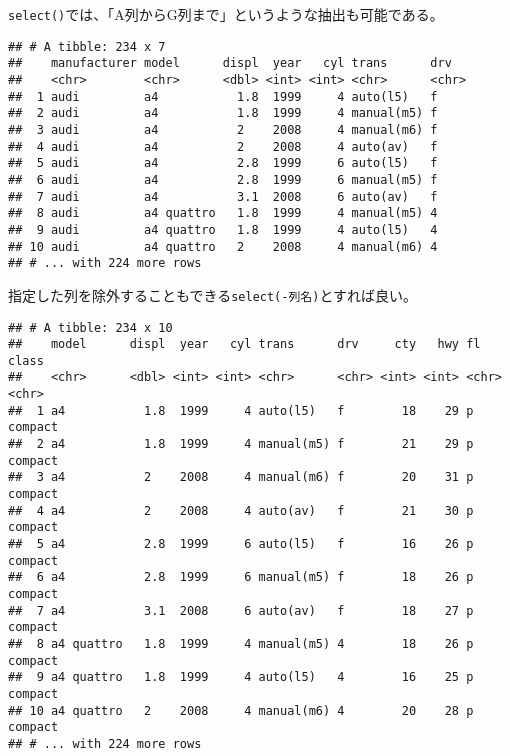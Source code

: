 \documentclass[]{book}
\newenvironment{Shaded}{\begin{snugshade}}{\end{snugshade}}
\newcommand{\KeywordTok}[1]{\textcolor[rgb]{0.13,0.29,0.53}{\textbf{#1}}}
\newcommand{\StringTok}[1]{\textcolor[rgb]{0.31,0.60,0.02}{#1}}
\newcommand{\CommentTok}[1]{\textcolor[rgb]{0.56,0.35,0.01}{\textit{#1}}}
\newcommand{\OperatorTok}[1]{\textcolor[rgb]{0.81,0.36,0.00}{\textbf{#1}}}
\newcommand{\NormalTok}[1]{#1}
\begin{document}
\texttt{select()}では、「A列からG列まで」というような抽出も可能である。

\begin{Shaded}
\end{Shaded}

\begin{verbatim}
## # A tibble: 234 x 7
##    manufacturer model      displ  year   cyl trans      drv  
##    <chr>        <chr>      <dbl> <int> <int> <chr>      <chr>
##  1 audi         a4           1.8  1999     4 auto(l5)   f    
##  2 audi         a4           1.8  1999     4 manual(m5) f    
##  3 audi         a4           2    2008     4 manual(m6) f    
##  4 audi         a4           2    2008     4 auto(av)   f    
##  5 audi         a4           2.8  1999     6 auto(l5)   f    
##  6 audi         a4           2.8  1999     6 manual(m5) f    
##  7 audi         a4           3.1  2008     6 auto(av)   f    
##  8 audi         a4 quattro   1.8  1999     4 manual(m5) 4    
##  9 audi         a4 quattro   1.8  1999     4 auto(l5)   4    
## 10 audi         a4 quattro   2    2008     4 manual(m6) 4    
## # ... with 224 more rows
\end{verbatim}

指定した列を除外することもできる\texttt{select(-列名)}とすれば良い。

\begin{Shaded}
\end{Shaded}

\begin{verbatim}
## # A tibble: 234 x 10
##    model      displ  year   cyl trans      drv     cty   hwy fl    class  
##    <chr>      <dbl> <int> <int> <chr>      <chr> <int> <int> <chr> <chr>  
##  1 a4           1.8  1999     4 auto(l5)   f        18    29 p     compact
##  2 a4           1.8  1999     4 manual(m5) f        21    29 p     compact
##  3 a4           2    2008     4 manual(m6) f        20    31 p     compact
##  4 a4           2    2008     4 auto(av)   f        21    30 p     compact
##  5 a4           2.8  1999     6 auto(l5)   f        16    26 p     compact
##  6 a4           2.8  1999     6 manual(m5) f        18    26 p     compact
##  7 a4           3.1  2008     6 auto(av)   f        18    27 p     compact
##  8 a4 quattro   1.8  1999     4 manual(m5) 4        18    26 p     compact
##  9 a4 quattro   1.8  1999     4 auto(l5)   4        16    25 p     compact
## 10 a4 quattro   2    2008     4 manual(m6) 4        20    28 p     compact
## # ... with 224 more rows
\end{verbatim}
\end{document}
